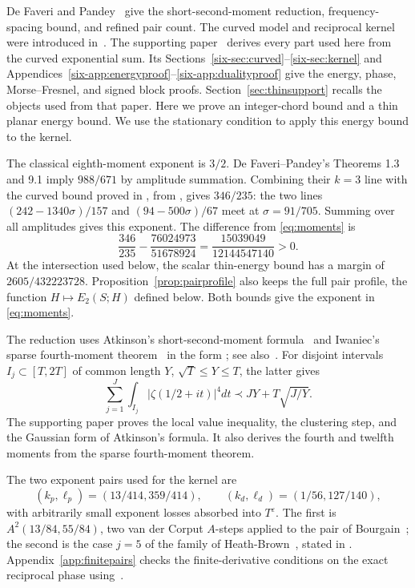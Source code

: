 \documentclass[11pt]{amsart}
\numberwithin{equation}{section}
\begin{document}
De Faveri and Pandey~\cite{dFP} give the short-second-moment reduction,
frequency-spacing bound, and refined pair count.
The curved model and reciprocal kernel were introduced in~\cite{B38}.
The supporting paper~\cite{Weighted} derives every part used here from
the curved exponential sum. Its
Sections~\ref*{six-sec:curved}--\ref*{six-sec:kernel} and
Appendices~\ref*{six-app:energyproof}--\ref*{six-app:dualityproof}
give the energy, phase, Morse--Fresnel, and signed block proofs.
Section~\ref{sec:thinsupport} recalls the objects used from that paper.
Here we prove an integer-chord bound and a thin planar energy bound.
We use the stationary condition to apply this energy bound to the kernel.

The classical eighth-moment exponent is $3/2$. De Faveri--Pandey's
Theorems 1.3 and 9.1 imply $988/671$ by amplitude summation.
Combining their $k=3$ line with the curved bound proved in
\cite[Proposition~\ref*{six-prop:curvatureline}]{Weighted}, from
\cite[Theorem 6]{B38}, gives $346/235$:
the two lines $(242-1340\sigma)/157$ and $(94-500\sigma)/67$ meet at
$\sigma=91/705$. Summing over all amplitudes gives this exponent.
The difference from \eqref{eq:moments} is
\begin{equation}\label{eq:gain}
\frac{346}{235}-\frac{76024973}{51678924}
 =\frac{15039049}{12144547140}>0.
\end{equation}
At the intersection used below, the scalar thin-energy bound has a
margin of $2605/432223728$. Proposition~\ref{prop:pairprofile}
also keeps the full pair profile, the function $H\mapsto E_2(S;H)$
defined below. Both bounds give the exponent in \eqref{eq:moments}.

The reduction uses Atkinson's short-second-moment formula~\cite{Atk49}
and Iwaniec's sparse fourth-moment theorem~\cite[Theorem~4]{Iwa80} in
the form \cite[(\ref*{six-eq:basefourth})]{Weighted}; see
also~\cite{Jut91}. For disjoint intervals $I_j\subset[T,2T]$ of common
length $Y$, $\sqrt T\le Y\le T$, the latter gives
\[
 \sum_{j=1}^J\int_{I_j}|\zeta(1/2+it)|^4dt
 \prec JY+T\sqrt{J/Y}.
\]
The supporting paper proves the local value inequality, the clustering
step, and the Gaussian form of Atkinson's formula. It also derives the
fourth and twelfth moments from the sparse fourth-moment theorem.

The two exponent pairs used for the kernel are
\[
 (k_p,\ell_p)=(13/414,359/414),\qquad
 (k_d,\ell_d)=(1/56,127/140),
\]
with arbitrarily small exponent losses absorbed into $T^\varepsilon$.
The first is $A^2(13/84,55/84)$, two van der Corput $A$-steps applied to
the pair of Bourgain~\cite{Bou17}; the second is the case $j=5$ of the
family of Heath-Brown~\cite{HB17}, stated in
\cite[Lemma~\ref*{six-lem:hb}]{Weighted}.
Appendix~\ref{app:finitepairs} checks the finite-derivative conditions
on the exact reciprocal phase using~\cite{TY}.
\end{document}
